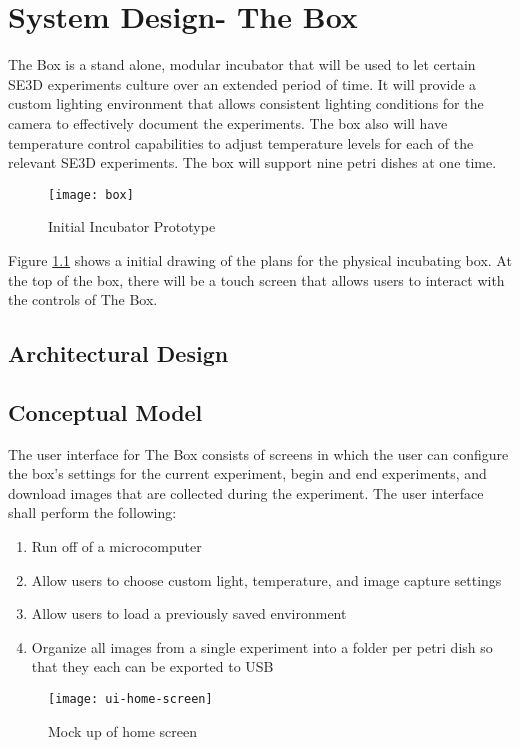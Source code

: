 \chapter{System Design- The Box}

The Box is a stand alone, modular incubator that will be used to let certain SE3D experiments culture over an extended period of time. It will provide a custom lighting environment that allows consistent lighting conditions for the camera to effectively document the experiments. The box also will have temperature control capabilities to adjust temperature levels for each of the relevant SE3D experiments. The box will support nine petri dishes at one time.

\begin{figure}[H]
\caption{\label{figure:box} Initial Incubator Prototype}
\texttt{[image: box]}
\end{figure}

Figure \ref{figure:box} shows a initial drawing of the plans for the physical incubating box. At the top of the box, there will be a touch screen that allows users to interact with the controls of The Box.



\section{Architectural Design}
\section{Conceptual Model}

The user interface for The Box consists of screens in which the user can configure the box’s settings for the current experiment, begin and end experiments, and download images that are collected during the experiment. The user interface shall perform the following: 

\begin{enumerate}
	\item	Run off of a microcomputer
	\item	Allow users to choose custom light, temperature, and image capture settings
	\item	Allow users to load a previously saved environment 
	\item	Organize all images from a single experiment into a folder per petri dish so that they each can be exported to USB 

\end{enumerate}
\begin{figure}[H]
\texttt{[image: ui-home-screen]}
\caption{\label{figure:ui-home} Mock up of home screen}
\end{figure}

